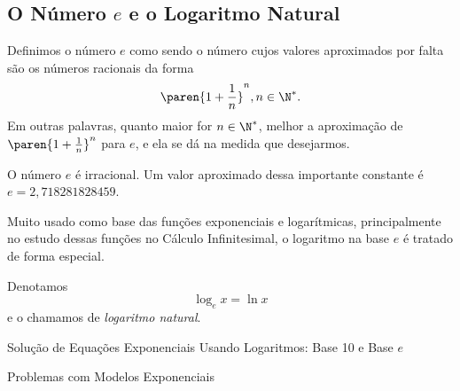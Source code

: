 \subsection{O Número $e$ e o Logaritmo Natural}

\begin{definition}
Definimos o número $e$ como sendo o número cujos valores aproximados
por falta são os números racionais da forma $$
\paren{1+ \frac 1 n}^n , n\in \N^*.$$ Em outras palavras, quanto
maior for $n \in \N^*$, melhor a aproximação de $\paren{1+ \frac
1 n}^n$ para $e$, e ela se dá na medida que desejarmos.
\end{definition}

\begin{remark}
O número $e$ é irracional. Um valor aproximado dessa importante
constante é $e = 2{,}718281828459$.
\end{remark}

Muito usado como base das funções exponenciais e logarítmicas,
principalmente no estudo dessas funções no Cálculo Infinitesimal, o
logaritmo na base $e$ é tratado de forma especial.

\begin{definition}
Denotamos $$\log_e x = \ln x$$ e o chamamos de \emph{logaritmo
natural}.
\end{definition}

\begin{onlineact}
    {Solução de Equações Exponenciais Usando
Logaritmos: Base 10 e Base $e$}
\end{onlineact}

\begin{onlineact}
    {Problemas com Modelos Exponenciais}
\end{onlineact}